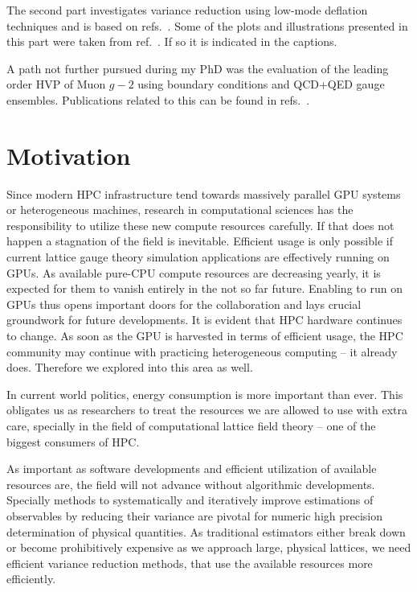 The second part investigates variance reduction using low-mode deflation techniques and is based on refs.~.
Some of the plots and illustrations presented in this part were taken from ref.~.
If so it is indicated in the captions.

A path not further pursued during my PhD was the evaluation of the leading order HVP of Muon $g-2$ using \Cstar boundary conditions and QCD+QED gauge ensembles.
Publications related to this can be found in refs.~.

\section{Motivation}

Since modern HPC infrastructure tend towards massively parallel GPU systems or heterogeneous machines, research in computational sciences has the responsibility to utilize these new compute resources carefully.
If that does not happen a stagnation of the field is inevitable.
Efficient usage is only possible if current lattice gauge theory simulation applications are effectively running on GPUs.
As available pure-CPU compute resources are decreasing yearly, it is expected for them to vanish entirely in the not so far future.
Enabling \openqxd to run on GPUs thus opens important doors for the \RCstar collaboration and lays crucial groundwork for future developments.
It is evident that HPC hardware continues to change.
As soon as the GPU is harvested in terms of efficient usage, the HPC community may continue with practicing heterogeneous computing -- it already does.
Therefore we explored into this area as well.

In current world politics, energy consumption is more important than ever.
This obligates us as researchers to treat the resources we are allowed to use with extra care, specially in the field of computational lattice field theory -- one of the biggest consumers of HPC.

As important as software developments and efficient utilization of available resources are, the field will not advance without algorithmic developments.
Specially methods to systematically and iteratively improve estimations of observables by reducing their variance are pivotal for numeric high precision determination of physical quantities.
As traditional estimators either break down or become prohibitively expensive as we approach large, physical lattices, we need efficient variance reduction methods, that use the available resources more efficiently.

